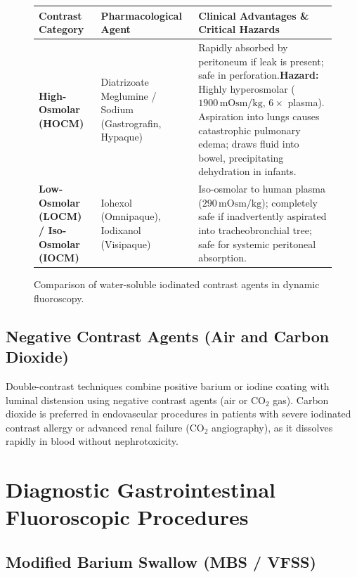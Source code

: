 \documentclass[11pt,a4paper]{article}
\begin{document}
\begin{figure}[htbp]
\centering
\setlength{\tabcolsep}{4pt}
\begin{tabular}{p{3.2cm}p{5.5cm}p{5.5cm}}
\toprule
\textbf{Contrast Category} & \textbf{Pharmacological Agent} & \textbf{Clinical Advantages \& Critical Hazards} \\
\midrule
\textbf{High-Osmolar (HOCM)} & Diatrizoate Meglumine / Sodium (Gastrografin, Hypaque) & Rapidly absorbed by peritoneum if leak is present; safe in perforation.\newline \textbf{Hazard:} Highly hyperosmolar ($1900\,\text{mOsm/kg}$, $6\times$ plasma). Aspiration into lungs causes catastrophic pulmonary edema; draws fluid into bowel, precipitating dehydration in infants. \\
\addlinespace
\textbf{Low-Osmolar (LOCM) / Iso-Osmolar (IOCM)} & Iohexol (Omnipaque), Iodixanol (Visipaque) & Iso-osmolar to human plasma ($290\,\text{mOsm/kg}$); completely safe if inadvertently aspirated into tracheobronchial tree; safe for systemic peritoneal absorption. \\
\bottomrule
\end{tabular}
\caption{Comparison of water-soluble iodinated contrast agents in dynamic fluoroscopy.}
\label{tab:contrast_comparison}
\end{figure}

\subsection{Negative Contrast Agents (Air and Carbon Dioxide)}

Double-contrast techniques combine positive barium or iodine coating with luminal distension using negative contrast agents (air or $\text{CO}_2$ gas). Carbon dioxide is preferred in endovascular procedures in patients with severe iodinated contrast allergy or advanced renal failure ($\text{CO}_2$ angiography), as it dissolves rapidly in blood without nephrotoxicity.

\section{Diagnostic Gastrointestinal Fluoroscopic Procedures}

\subsection{Modified Barium Swallow (MBS / VFSS)}
\end{document}
